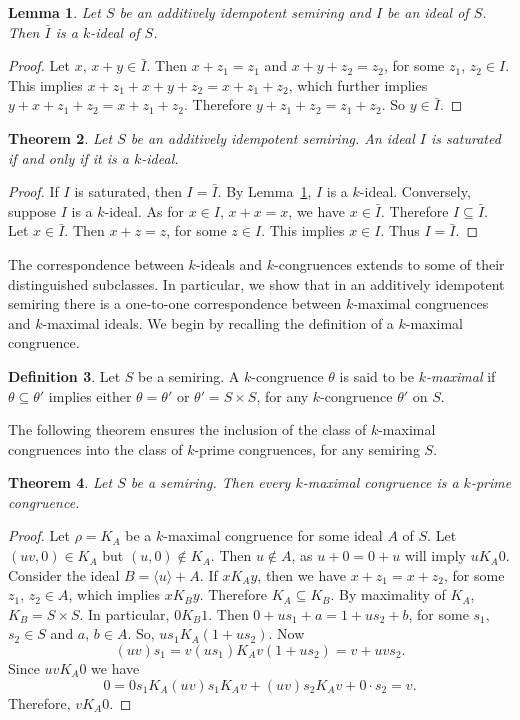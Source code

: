 \documentclass[11pt,english]{amsart}
\newtheorem{theorem}{Theorem}[section]
\newtheorem{lemma}[theorem]{Lemma}
\theoremstyle{definition}
\newtheorem{definition}[theorem]{Definition}
\numberwithin{equation}{section}
\begin{document}
 \begin{lemma}\label{loc10}
     Let $S$ be an additively idempotent semiring and $I$ be an ideal of $S$. Then $\bar{I}$ is a $k$-ideal of $S$.
 \end{lemma}
 
 \begin{proof}
     Let $x$, $x+y\in \bar{I}$. Then $x+z_1=z_1$ and $x+y+z_2=z_2$, for some $z_1$, $z_2\in I$. This implies $x+z_1+x+y+z_2=x+z_1+z_2$, which further implies $y+x+z_1+z_2=x+z_1+z_2$. Therefore $y+z_1+z_2=z_1+z_2$. So $y\in \bar{I}$. 
 \end{proof}
 
 \begin{theorem}\label{saturated iff k-ideal}
     Let $S$ be an additively idempotent semiring. An ideal $I$ is saturated if and only if it is a $k$-ideal.
 \end{theorem}
 
 \begin{proof}
     If $I$ is saturated, then $I=\bar{I}$. By Lemma~\ref{loc10}, $I$ is a $k$-ideal. Conversely, suppose $I$ is a $k$-ideal. As for $x\in I$, $x+x=x$, we have $x\in \bar{I}$. Therefore $I\subseteq \bar{I}$. Let $x\in \bar{I}$. Then $x+z=z$, for some $z\in I$. This implies $x\in I$. Thus $I=\bar{I}$. 
 \end{proof}
The correspondence between $k$-ideals and $k$-congruences extends to some of their distinguished subclasses. In particular, we show that in an additively idempotent semiring there is a one-to-one correspondence between $k$-maximal congruences and $k$-maximal ideals. We begin by recalling the definition of a $k$-maximal congruence.
 \begin{definition}
     Let $S$ be a semiring. A $k$-congruence $\theta$ is said  to be \emph{$k$-maximal} if $\theta\subseteq \theta'$ implies either $\theta=\theta'$ or $\theta'=S\times S$, for any $k$-congruence $\theta'$ on $S$.
 \end{definition}
 The following theorem ensures the inclusion of the class of $k$-maximal congruences into the class of $k$-prime congruences, for any semiring $S$. 
  \begin{theorem}
    Let $S$ be a semiring. Then every $k$-maximal congruence is a $k$-prime congruence.
 \end{theorem}
 
 \begin{proof}
     Let $\rho=K_A$ be a $k$-maximal congruence for some ideal $A$ of $S$. Let $(uv,0)\in K_A$ but $(u,0)\notin K_A$. Then $u\notin A$, as $u+0=0+u$ will imply $uK_A0$. Consider the ideal $B=\langle u \rangle +A$. If $xK_Ay$, then we have $x+z_1=x+z_2$, for some $z_1$, $z_2\in A$, which implies $xK_By$. Therefore $K_A\subseteq K_B$. By maximality of $K_A$, $K_B=S\times S$. In particular, $0K_B1$. Then $0+us_1+a=1+us_2+b$, for some $s_1$, $s_2\in S$ and $a$, $b\in A$. So, $us_1 K_A(1+us_2)$. Now \[(uv)s_1=v(us_1)K_Av(1+us_2)=v+uvs_2.\] Since $uvK_A0$ we have \[0=0s_1K_A(uv)s_1K_Av+(uv)s_2K_Av+0\cdot s_2=v.\] Therefore, $vK_A0$.
 \end{proof}
\end{document}
